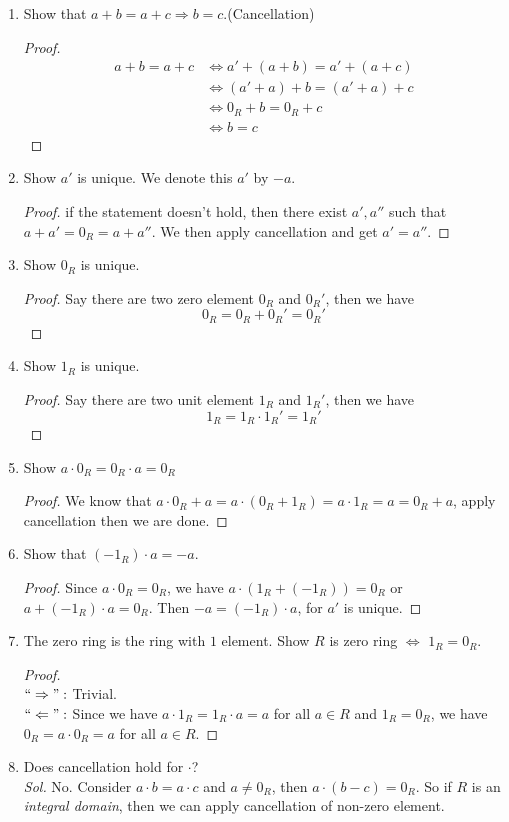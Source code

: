 \documentclass{mynotes}
\begin{document}
\begin{exercise}\mbox{}
\begin{enumerate}
\item Show that $a+b=a+c\Rightarrow b=c.$(Cancellation)
\begin{proof}
\begin{align*}
a+b=a+c &\Leftrightarrow a'+ (a+b) = a' + (a+c)\\
&\Leftrightarrow (a'+a) +b = (a'+a) +c\\
&\Leftrightarrow 0_R+b =0_R +c\\
&\Leftrightarrow b=c
\end{align*}
\end{proof}
\item Show $a'$ is unique. We denote this $a'$ by $-a$.
\begin{proof}
if the statement doesn't hold, then there exist $a',a''$ such that $a+a' =0_R=a+a''$. We then apply cancellation and get $a'=a''$.
\end{proof}
\item Show $0_R$ is unique.
\begin{proof}
Say there are two zero element $0_R$ and $0_R'$, then we have
$$0_R =0_R+0_R' = 0_R'$$
\end{proof}
\item Show $1_R$ is unique.
\begin{proof}
Say there are two unit element $1_R$ and $1_R'$, then we have
$$1_R = 1_R\cdot 1_R' =1_R'$$
\end{proof}
\item Show $a\cdot 0_R =0_R \cdot a = 0_R$
\begin{proof}
We know that $a\cdot 0_R +a=a\cdot (0_R+1_R) =a\cdot 1_R =a = 0_R+a$, apply cancellation then we are done.
\end{proof}
\item Show that $(-1_R)\cdot a =-a$.
\begin{proof}
Since $a\cdot 0_R = 0_R$, we have $a\cdot(1_R+(-1_R)) =0_R$ or $a+ (-1_R)\cdot a = 0_R$. Then $-a=(-1_R)\cdot a$, for $a'$ is unique.
\end{proof}
\item The zero ring is the ring with $1$ element. Show $R$ is zero ring $\Leftrightarrow$ $1_R = 0_R$.
\begin{proof}\mbox{}\\
$``\Rightarrow":$ Trivial.\\
$``\Leftarrow":$ Since we have $a\cdot 1_R =1_R\cdot a =a$ for all $a\in R$ and $1_R=0_R$, we have $0_R = a\cdot 0_R= a$ for all $a\in R$.
\end{proof}
\item Does cancellation hold for $\cdot$\;?\\
\textit{Sol.} No. Consider $a\cdot b = a\cdot c$ and $a\neq 0_R$, then $a\cdot(b-c)=0_R$. So if $R$ is an \emph{integral domain}, then we can apply cancellation of non-zero element.
\end{enumerate}
\end{exercise}
\end{document}
